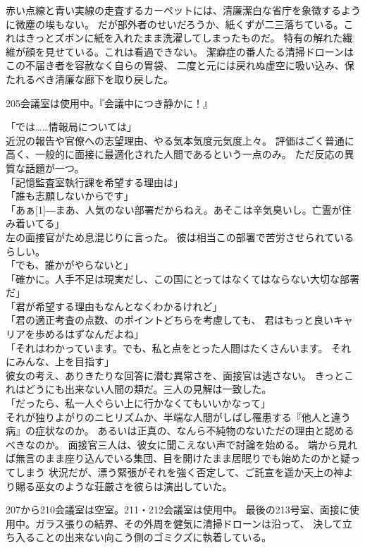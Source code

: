 \documentclass[../NenokuniMain]{subfiles}
\begin{document}
赤い点線と青い実線の走査するカーペットには、清廉潔白な省庁を象徴するように微塵の埃もない。
だが部外者のせいだろうか、紙くずが二三落ちている。これはきっとズボンに紙を入れたまま洗濯してしまったものだ。
特有の解れた繊維が顔を見せている。これは看過できない。
潔癖症の番人たる清掃ドローンはこの不届き者を容赦なく自らの胃袋、
二度と元には戻れぬ虚空に吸い込み、保たれるべき清廉な廊下を取り戻した。

205会議室は使用中。『会議中につき静かに！』

「では……情報局については」\\
近況の報告や官僚への志望理由、やる気本気度元気度上々。
評価はごく普通に高く、一般的に面接に最適化された人間であるという一点のみ。
ただ反応の異質な話題が一つ。\\
「記憶監査室執行課を希望する理由は」\\
「誰も志願しないからです」\\
「あぁ\scalebox{2}[1]{―}まあ、人気のない部署だからねえ。あそこは辛気臭いし。亡霊が住み着いてる」\\
左の面接官がため息混じりに言った。
彼は相当この部署で苦労させられているらしい。\\
「でも、誰かがやらないと」\\
「確かに。人手不足は現実だし、この国にとってはなくてはならない大切な部署だ」\\
「君が希望する理由もなんとなくわかるけれど」\\
「君の適正考査の点数、のポイントどちらを考慮しても、
君はもっと良いキャリアを歩めるはずなんだよね」\\
「それはわかっています。でも、私と点をとった人間はたくさんいます。
それにみんな、上を目指す」\\
彼女の考え、ありきたりな回答に潜む異常さを、面接官は逃さない。
きっとこれはどうにも出来ない人間の類だ。三人の見解は一致した。\\
「だったら、私一人ぐらい上に行かなくてもいいかなって」\\
それが独りよがりのニヒリズムか、半端な人間がしばし罹患する『他人と違う病』の症状なのか。
あるいは正真の、なんら不純物のないただの理由と認めるべきなのか。
面接官三人は、彼女に聞こえない声で討論を始める。
端から見れば無言のまま座り込んでいる集団、目を開けたまま居眠りでも始めたのかと疑ってしまう
状況だが、漂う緊張がそれを強く否定して、ご託宣を遥か天上の神より賜る巫女のような荘厳さを彼らは演出していた。

207から210会議室は空室。211・212会議室は使用中。
最後の213号室、面接に使用中。ガラス張りの結界、その外周を健気に清掃ドローンは沿って、
決して立ち入ることの出来ない向こう側のゴミクズに執着している。
\end{document}
